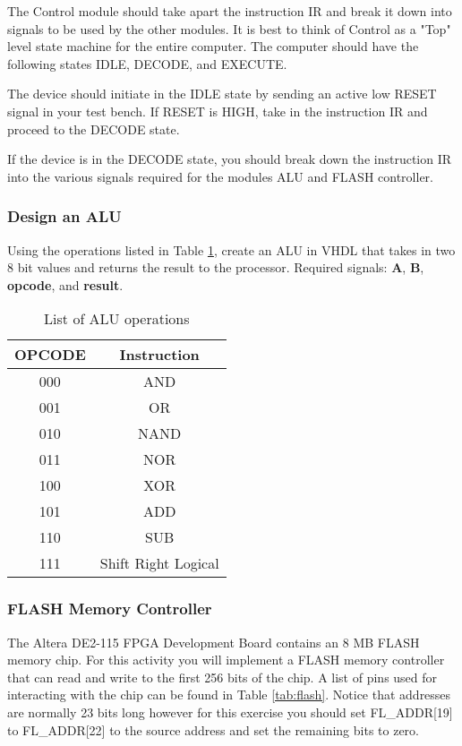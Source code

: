 The Control module should take apart the instruction IR and break it down into signals to be used by the other modules. It is best to think of Control as a "Top" level state machine for the entire computer. The computer should have the following states IDLE, DECODE, and EXECUTE.

The device should initiate in the IDLE state by sending an active low RESET signal in your test bench. If RESET is HIGH, take in the instruction IR and proceed to the DECODE state.

If the device is in the DECODE state, you should break down the instruction IR into the various signals required for the modules ALU and FLASH controller. 
	

\subsubsection{Design an ALU}
Using the operations listed in Table \ref{tab:aluop}, create an ALU in VHDL that takes in two 8 bit values and returns the result to the processor. Required signals: {\bf A}, {\bf B}, {\bf opcode}, and {\bf result}.

\begin {table}[H]
	\caption {List of ALU operations} 
	\label{tab:aluop} 
	\begin{center}
    		\begin{tabular}{ | c | c |}
			\hline
 			{\bf OPCODE} & {\bf Instruction} \\ \hline
			000 & AND \\ \hline
			001 & OR \\ \hline
			010 & NAND \\ \hline
			011 & NOR \\ \hline
			100 & XOR \\ \hline
			101 & ADD \\ \hline
			110 & SUB \\ \hline
			111 & Shift Right Logical \\
			\hline
    		\end{tabular}
	\end{center}
\end{table}

\subsubsection{FLASH Memory Controller}
The Altera DE2-115 FPGA Development Board contains an 8 MB FLASH memory chip. For this activity you will implement a FLASH memory controller that can read and write to the first 256 bits of the chip. A list of pins used for interacting with the chip can be found in Table \ref{tab:flash}. Notice that addresses are normally 23 bits long however for this exercise you should set FL\_ADDR[19] to FL\_ADDR[22] to the source address and set the remaining bits to zero. 

